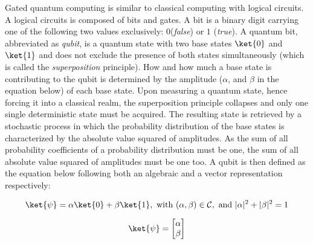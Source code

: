 \documentclass[../main.tex]{subfiles}
\begin{document}
Gated quantum computing is similar to classical computing with logical circuits. A logical circuits is composed of bits and gates. A bit is a binary digit carrying one of the following two values exclusively: $0$(\textit{false}) or $1$ (\textit{true}). A quantum bit, abbreviated as \emph{qubit}, is a quantum state with two base states $\ket{0}$ and $\ket{1}$ and does not exclude the presence of both states simultaneously (which is called the \emph{superposition} principle). How and how much a base state is contributing to the qubit is determined by the amplitude ($\alpha$, and $\beta$ in the equation below) of each base state. Upon measuring a quantum state, hence forcing it into a classical realm, the superposition principle collapses and only one single deterministic state must be acquired. The resulting state is retrieved by a stochastic process in which the probability distribution of the base states is characterized by the absolute value squared of amplitudes. As the sum of all probability coefficients of a probability distribution must be one, the sum of all absolute value squared of amplitudes must be one too. A qubit is then defined as the equation below following both an algebraic and a vector representation respectively:

\begin{equation}
    \ket{\psi} = \alpha \ket{0} + \beta \ket{1}, \, \,\text{with} \,\, (\alpha, \beta) \in \mathcal{C},
    \, \,\text{and} \, \, |\alpha|^2 + |\beta|^2 = 1   
    \label{eq: qubit_definition}
\end{equation}
 
\begin{equation}
    \ket{\psi} = \begin{bmatrix}\alpha \\ \beta \end{bmatrix}
    \label{eq: qubit_vector_representation}
\end{equation}
\end{document}
